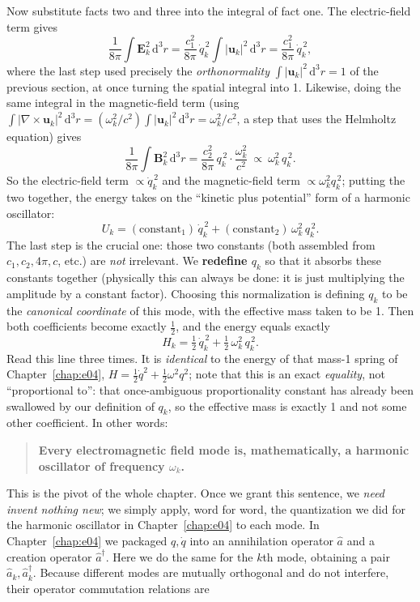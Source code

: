 Now substitute facts two and three into the integral of fact one. The electric-field term gives
\[
  \frac1{8\pi}\int\bm E_k^2\,\mathrm d^3r
  =\frac{c_1^2}{8\pi}\,\dot q_k^{\,2}\int|\bm u_k|^2\,\mathrm d^3r
  =\frac{c_1^2}{8\pi}\,\dot q_k^{\,2},
\]
where the last step used precisely the \emph{orthonormality} \(\int|\bm u_k|^2\,\mathrm d^3r=1\) of the previous section, at once turning the spatial integral into 1. Likewise, doing the same integral in the magnetic-field term (using \(\int|\nabla\times\bm u_k|^2\,\mathrm d^3r=(\omega_k^2/c^2)\int|\bm u_k|^2\,\mathrm d^3r=\omega_k^2/c^2\), a step that uses the Helmholtz equation) gives
\[
  \frac1{8\pi}\int\bm B_k^2\,\mathrm d^3r
  =\frac{c_2^2}{8\pi}\,q_k^{\,2}\cdot\frac{\omega_k^2}{c^2}
  \ \propto\ \omega_k^2\,q_k^{\,2}.
\]
So the electric-field term \(\propto\dot q_k^{\,2}\) and the magnetic-field term \(\propto\omega_k^2 q_k^{\,2}\); putting the two together, the energy takes on the ``kinetic plus potential'' form of a harmonic oscillator:
\[
  U_k=(\text{constant}_1)\,\dot q_k^{\,2}+(\text{constant}_2)\,\omega_k^2\,q_k^{\,2}.
\]
The last step is the crucial one: those two constants (both assembled from \(c_1,c_2,4\pi,c\), etc.) are \emph{not} irrelevant. We \textbf{redefine \(q_k\)} so that it absorbs these constants together (physically this can always be done: it is just multiplying the amplitude by a constant factor). Choosing this normalization is defining \(q_k\) to be the \emph{canonical coordinate} of this mode, with the effective mass taken to be 1. Then both coefficients become exactly \(\tfrac12\), and the energy equals exactly
\[
  H_k=\tfrac12\,\dot q_k^{\,2}+\tfrac12\,\omega_k^2\,q_k^{\,2}.
\]
Read this line three times. It is \emph{identical} to the energy of that mass-1 spring of Chapter~\ref{chap:e04}, \(H=\tfrac12\dot q^2+\tfrac12\omega^2 q^2\); note that this is an exact \emph{equality}, not ``proportional to'': that once-ambiguous proportionality constant has already been swallowed by our definition of \(q_k\), so the effective mass is exactly 1 and not some other coefficient. In other words:

\begin{quote}
\textbf{Every electromagnetic field mode is, mathematically, a harmonic oscillator of frequency \(\omega_k\).}
\end{quote}

This is the pivot of the whole chapter. Once we grant this sentence, we \emph{need invent nothing new}; we simply apply, word for word, the quantization we did for the harmonic oscillator in Chapter~\ref{chap:e04} to each mode. In Chapter~\ref{chap:e04} we packaged \(q,\dot q\) into an annihilation operator \(\hat a\) and a creation operator \(\hat a^\dagger\). Here we do the same for the \(k\)th mode, obtaining a pair \(\hat a_k,\hat a_k^\dagger\). Because different modes are mutually orthogonal and do not interfere, their operator commutation relations are

